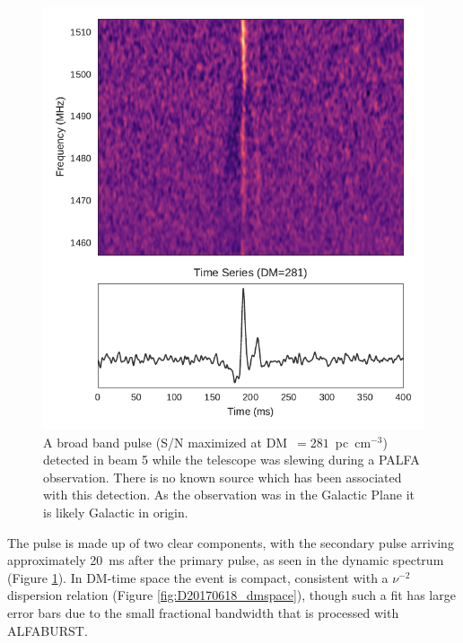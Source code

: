 \documentclass[a4paper,fleqn,usenatbib]{mnras}
\begin{document}
\begin{figure}
    \includegraphics[width=1.0\linewidth]{figures/Beam5_fb_D20170618T005616_buffer2_spectrum.pdf}
    \caption{A broad band pulse (S/N maximized at DM~$=281$~pc~cm$^{-3}$)
    detected in beam 5 while the telescope was slewing during a PALFA
    observation. There is no known source which has been associated with this
    detection. As the observation was in the Galactic Plane it is likely
    Galactic in origin.
    }
    \label{fig:D20170618_spectrum}
\end{figure}

The pulse is made up of two clear components, with the secondary
pulse arriving approximately 20~ms after the primary pulse, as seen in the
dynamic spectrum (Figure \ref{fig:D20170618_spectrum}). In DM-time space the
event is compact, consistent with a $\nu^{-2}$ dispersion relation (Figure
\ref{fig:D20170618_dmspace}), though such a fit has large error bars due to the
small fractional bandwidth that is processed with ALFABURST.
\end{document}
